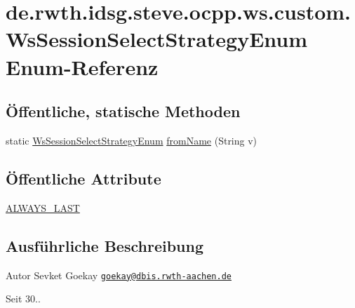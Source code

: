 \hypertarget{enumde_1_1rwth_1_1idsg_1_1steve_1_1ocpp_1_1ws_1_1custom_1_1_ws_session_select_strategy_enum}{\section{de.\+rwth.\+idsg.\+steve.\+ocpp.\+ws.\+custom.\+Ws\+Session\+Select\+Strategy\+Enum Enum-\/\+Referenz}
\label{enumde_1_1rwth_1_1idsg_1_1steve_1_1ocpp_1_1ws_1_1custom_1_1_ws_session_select_strategy_enum}
}
\subsection*{Öffentliche, statische Methoden}
\begin{DoxyCompactItemize}
\item 
static \hyperlink{enumde_1_1rwth_1_1idsg_1_1steve_1_1ocpp_1_1ws_1_1custom_1_1_ws_session_select_strategy_enum}{Ws\+Session\+Select\+Strategy\+Enum} \hyperlink{enumde_1_1rwth_1_1idsg_1_1steve_1_1ocpp_1_1ws_1_1custom_1_1_ws_session_select_strategy_enum_af0a5e58a028ed213dbf697fc4e28561a}{from\+Name} (String v)
\end{DoxyCompactItemize}
\subsection*{Öffentliche Attribute}
\begin{DoxyCompactItemize}
\item 
\hyperlink{enumde_1_1rwth_1_1idsg_1_1steve_1_1ocpp_1_1ws_1_1custom_1_1_ws_session_select_strategy_enum_ab2256081cfc6924853236570b489de0b}{A\+L\+W\+A\+Y\+S\+\_\+\+L\+A\+S\+T}
\end{DoxyCompactItemize}


\subsection{Ausführliche Beschreibung}
\begin{DoxyAuthor}{Autor}
Sevket Goekay \href{mailto:goekay@dbis.rwth-aachen.de}{\tt goekay@dbis.\+rwth-\/aachen.\+de} 
\end{DoxyAuthor}
\begin{DoxySince}{Seit}
30.. 
\end{DoxySince}


